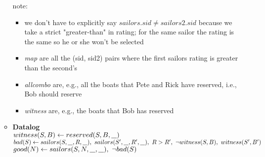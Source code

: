 \documentclass{article}
\newcommand{\anyvar}{\underline{\hspace{0.8em}}}
\newcommand{\DL}{\textbf{Datalog}}
\begin{document}
\begin{enumerate}
\begin{itemize}
	note:
	\begin{itemize}
		\item we don't have to explicitly say $sailors.sid \neq sailors2.sid$ because we take a strict "greater-than" in rating; for the same sailor the rating is the same so he or she won't be selected
		\item \textit{map} are all the (sid, sid2) pairs where the first sailors rating is greater than the second's
		\item \textit{allcombo} are, e.g., all the boats that Pete and Rick have reserved, i.e., Bob should reserve
		\item \textit{witness} are, e.g., the boats that Bob has reserved
	\end{itemize}
	\item \DL \\
	$ witness(S, B) \gets reserved(S, B, \anyvar) $ \\
	$ bad(S) \gets sailors(S, \anyvar, R, \anyvar),\ sailors(S', \anyvar, R', \anyvar),\ R > R',\ \neg witness(S, B),\  witness(S', B') $ \\
	$ good(N) \gets sailors(S, N, \anyvar, \anyvar), \ \neg bad(S)$
\end{itemize}

\end{enumerate}
\end{document}
